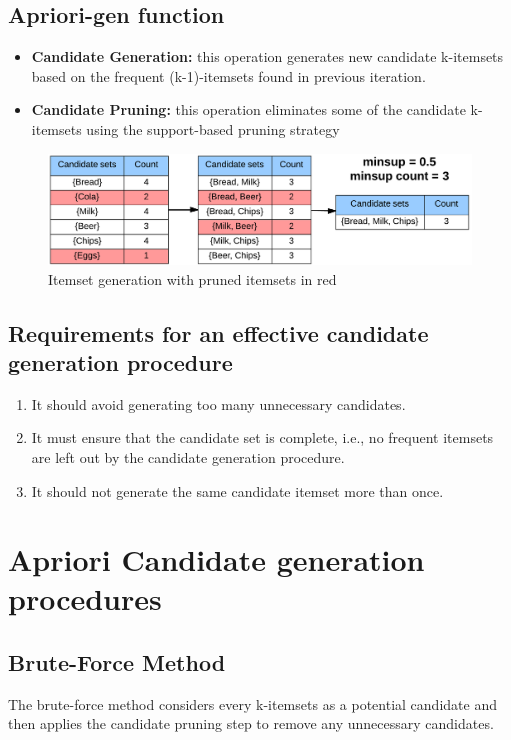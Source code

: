 		\subsection*{Apriori-gen function}
		\begin{itemize}
			\item {\bf Candidate Generation:} this operation generates new candidate
			k-itemsets based on the frequent (k-1)-itemsets found in previous iteration.
			\item {\bf Candidate Pruning:} this operation eliminates some of the candidate
			k-itemsets using the support-based pruning strategy
		\end{itemize}

		\begin{figure}[H]
			\centering
			\includegraphics[width=\textwidth]{pics/apriori.png}
			\caption{Itemset generation with pruned itemsets in red}
		\end{figure}

		\subsection*{Requirements for an effective candidate generation procedure}

		\begin{enumerate}
			\item It should avoid generating too many unnecessary candidates.
			\item It must ensure that the candidate set is complete, i.e., no frequent
			itemsets are left out by the candidate generation procedure. 
			\item It should not generate the same candidate itemset more than once.
		\end{enumerate}

		\clearpage
		\section{Apriori Candidate generation procedures}

			\subsection{Brute-Force Method}
				The brute-force method considers every k-itemsets as a potential candidate and then 
				applies the candidate pruning step to remove any unnecessary candidates. 

